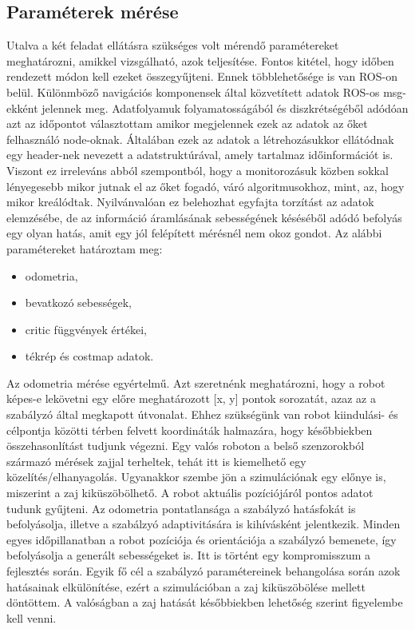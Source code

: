 \subsection{Paraméterek mérése}
Utalva a két feladat ellátásra szükséges volt mérendő paramétereket meghatározni, amikkel vizsgálható, azok teljesítése. Fontos kitétel, hogy időben rendezett módon kell ezeket összegyűjteni. Ennek többlehetősége is van ROS-on belül. Különmböző navigációs komponensek által közvetített adatok ROS-os msg-ekként jelennek meg. Adatfolyamuk folyamatosságából és diszkrétségéből adódóan azt az időpontot választottam amikor megjelennek ezek az adatok az őket felhasználó node-oknak. Általában ezek az adatok a létrehozásukkor ellátódnak egy header-nek nevezett a adatstruktúrával, amely tartalmaz időinformációt is. Viszont ez irreleváns abból szempontból, hogy a monitorozásuk közben sokkal lényegesebb mikor jutnak el az őket fogadó, váró algoritmusokhoz, mint, az, hogy mikor kreálódtak. Nyilvánvalóan ez belehozhat egyfajta torzítást az adatok elemzésébe, de az információ áramlásának sebességének késéséből adódó befolyás egy olyan hatás, amit egy jól felépített mérésnél nem okoz gondot. Az alábbi paramétereket határoztam meg:

\begin{itemize}
    \item odometria,
    \item bevatkozó sebességek,
    \item critic függvények értékei,
    \item tékrép és costmap adatok.
\end{itemize}

Az odometria mérése egyértelmű. Azt szeretnénk meghatározni, hogy a robot képes-e lekövetni egy előre meghatározott [x, y] pontok sorozatát, azaz az a szabályzó által megkapott útvonalat. Ehhez szükségünk van robot kiindulási- és célpontja közötti térben felvett koordináták halmazára, hogy későbbiekben összehasonlítást tudjunk végezni. Egy valós roboton a belső szenzorokból származó mérések zajjal terheltek, tehát itt is kiemelhető egy közelítés/elhanyagolás. Ugyanakkor szembe jön a szimulációnak egy előnye is, miszerint a zaj kiküszöbölhető. A robot aktuális pozíciójáról pontos adatot tudunk gyűjteni. Az odometria pontatlansága a szabályzó hatásfokát is befolyásolja, illetve a szabálzyó adaptivitására is kihívásként jelentkezik. Minden egyes időpillanatban a robot pozíciója és orientációja a szabályzó bemenete, így befolyásolja a generált sebességeket is. Itt is történt egy kompromisszum a fejlesztés során. Egyik fő cél a szabályzó paramétereinek behangolása során azok hatásainak elkülönítése, ezért a szimulációban a zaj kiküszöbölése mellett döntöttem. A valóságban a zaj hatását későbbiekben lehetőség szerint figyelembe kell venni.

